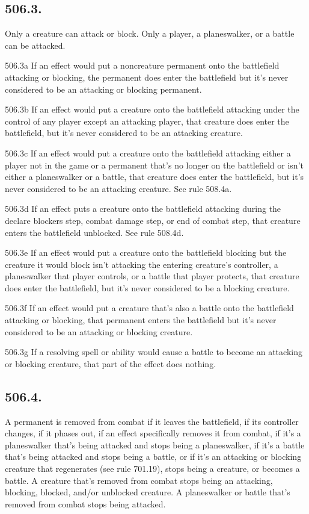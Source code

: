 \subsection*{506.3.}
Only a creature can attack or block. Only a player, a planeswalker, or a battle can be attacked.

506.3a If an effect would put a noncreature permanent onto the battlefield attacking or blocking, the permanent does enter the battlefield but it’s never considered to be an attacking or blocking permanent.

506.3b If an effect would put a creature onto the battlefield attacking under the control of any player except an attacking player, that creature does enter the battlefield, but it’s never considered to be an attacking creature.

506.3c If an effect would put a creature onto the battlefield attacking either a player not in the game or a permanent that’s no longer on the battlefield or isn’t either a planeswalker or a battle, that creature does enter the battlefield, but it’s never considered to be an attacking creature. See rule 508.4a.

506.3d If an effect puts a creature onto the battlefield attacking during the declare blockers step, combat damage step, or end of combat step, that creature enters the battlefield unblocked. See rule 508.4d.

506.3e If an effect would put a creature onto the battlefield blocking but the creature it would block isn’t attacking the entering creature’s controller, a planeswalker that player controls, or a battle that player protects, that creature does enter the battlefield, but it’s never considered to be a blocking creature.

506.3f If an effect would put a creature that’s also a battle onto the battlefield attacking or blocking, that permanent enters the battlefield but it’s never considered to be an attacking or blocking creature.

506.3g If a resolving spell or ability would cause a battle to become an attacking or blocking creature, that part of the effect does nothing.

\subsection*{506.4.}
A permanent is removed from combat if it leaves the battlefield, if its controller changes, if it phases out, if an effect specifically removes it from combat, if it’s a planeswalker that’s being attacked and stops being a planeswalker, if it’s a battle that’s being attacked and stops being a battle, or if it’s an attacking or blocking creature that regenerates (see rule 701.19), stops being a creature, or becomes a battle. A creature that’s removed from combat stops being an attacking, blocking, blocked, and/or unblocked creature. A planeswalker or battle that’s removed from combat stops being attacked.


